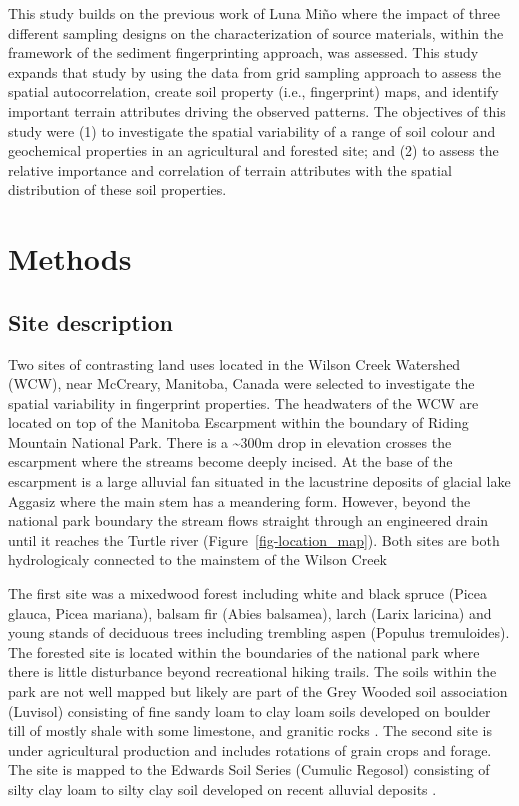 \documentclass[
  number]{elsarticle}
\begin{document}
This study builds on the previous work of Luna Miño \citep{lunamiño2024}
where the impact of three different sampling designs on the
characterization of source materials, within the framework of the
sediment fingerprinting approach, was assessed. This study expands that
study by using the data from grid sampling approach to assess the
spatial autocorrelation, create soil property (i.e., fingerprint) maps,
and identify important terrain attributes driving the observed patterns.
The objectives of this study were (1) to investigate the spatial
variability of a range of soil colour and geochemical properties in an
agricultural and forested site; and (2) to assess the relative
importance and correlation of terrain attributes with the spatial
distribution of these soil properties.

\section{Methods}\label{methods}

\subsection{Site description}\label{site-description}

Two sites of contrasting land uses located in the Wilson Creek Watershed
(WCW), near McCreary, Manitoba, Canada were selected to investigate the
spatial variability in fingerprint properties. The headwaters of the WCW
are located on top of the Manitoba Escarpment within the boundary of
Riding Mountain National Park. There is a \textasciitilde300m drop in
elevation crosses the escarpment where the streams become deeply
incised. At the base of the escarpment is a large alluvial fan situated
in the lacustrine deposits of glacial lake Aggasiz where the main stem
has a meandering form. However, beyond the national park boundary the
stream flows straight through an engineered drain until it reaches the
Turtle river (Figure~\ref{fig-location_map}). Both sites are both
hydrologicaly connected to the mainstem of the Wilson Creek

The first site was a mixedwood forest including white and black spruce
(Picea glauca, Picea mariana), balsam fir (Abies balsamea), larch (Larix
laricina) and young stands of deciduous trees including trembling aspen
(Populus tremuloides). The forested site is located within the
boundaries of the national park where there is little disturbance beyond
recreational hiking trails. The soils within the park are not well
mapped but likely are part of the Grey Wooded soil association (Luvisol)
consisting of fine sandy loam to clay loam soils developed on boulder
till of mostly shale with some limestone, and granitic rocks
\citep{ehrlich1958}. The second site is under agricultural production
and includes rotations of grain crops and forage. The site is mapped to
the Edwards Soil Series (Cumulic Regosol) consisting of silty clay loam
to silty clay soil developed on recent alluvial deposits
\citep{ehrlich1958}.
\end{document}
